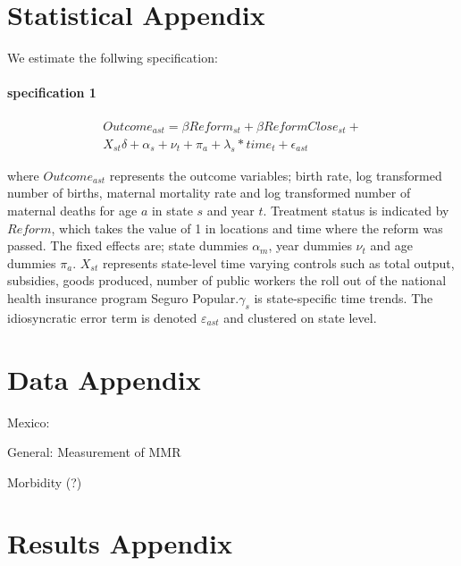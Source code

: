 \documentclass[a4paper, 11pt]{article}
\begin{document}
 
 \newpage
 \singlespacing
 
 
 
 \newpage
\begin{appendices}
\section{Statistical Appendix}
 	We estimate the follwing specification:
 	\paragraph{specification 1}
 	
 	
 	\begin{eqnarray*}\label{eq1}
 		{Outcome_{ast}= \beta Reform_{st} +\beta ReformClose_{st}+} \\  
 		{	X_{st}\delta +\alpha_{s} + \nu_{t} +\pi_{a}+ \lambda_{s}*time_{t} +\epsilon_{ast}}   
 	\end{eqnarray*}
 	
 	\noindent where $Outcome_{ast}$ represents the outcome variables; birth rate, log transformed number of births, maternal mortality rate and log transformed number of maternal deaths for age $a$ in state $s$ and year $t$. Treatment status is indicated by $Reform$, which takes the value of 1 in locations and time where the reform was passed. The fixed effects are; state dummies $\alpha_{m}$, year dummies  $\nu_{t}$ and age dummies $\pi_{a}$. $X_{st}$ represents state-level time varying controls such as total output, subsidies, goods produced, number of public workers the roll out of the national health insurance program Seguro Popular.$\gamma_{s}$ is state-specific time trends. The idiosyncratic error term is denoted $\varepsilon_{ast}$ and clustered on state  level.

\section{Data Appendix}
Mexico: \citet{Aguirre1997,Walkeretal2004,Schiavonetal2012}

General: Measurement of MMR \citet{Hilletal2007,RonsmansGraham2006,Yazbeck2007}

Morbidity (?) \citet{Adleretal2012}

\section{Results Appendix}
 	

\end{appendices}
\end{document}
